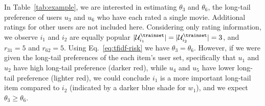 \begin{example}  
In Table~\ref{tab:example}, we are interested in estimating $\theta_3$ and $\theta_6$,  the long-tail preference of users $u_3$ and $u_6$ who have each rated a single movie. Additional ratings for other users  are not included here.  Considering only rating information, we observe $i_1$ and $i_2$ are  equally popular $|\mathcal{U}_{i_1}^{\trainset}| = |\mathcal{U}_{i_2}^{\trainset}|=3$, and $r_{31}=5$ and $r_{62}=5$. Using Eq.~\ref{eq:tfidf-risk}  we have $\theta_3 = \theta_6$. However, if we were given the long-tail preferences of the each item's user set, specifically that $u_1$ and $u_2$ have high long-tail preference (darker red), while $u_4$ and $u_5$ have lower long-tail preference (lighter red), we could conclude $i_1$ is a more important long-tail item compared to $i_2$ (indicated by a darker blue shade for $w_1$), and we expect  $\theta_3 \geq \theta_6$.



\label{ex:running}
\end{example}



